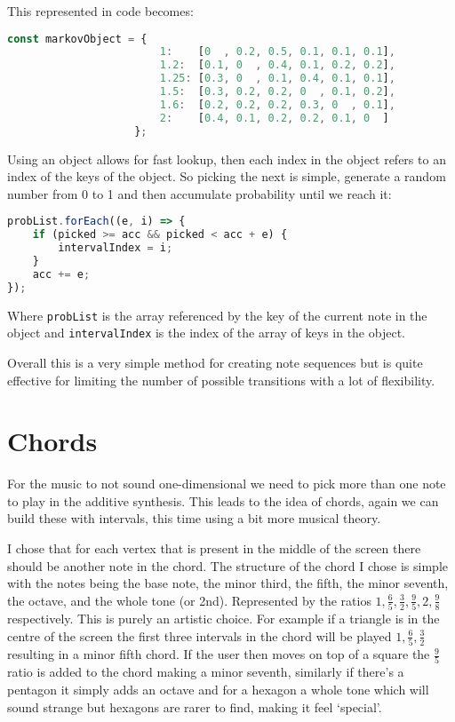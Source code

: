 This represented in code becomes: 
\begin{lstlisting}[language=Javascript]
const markovObject = {
                        1:    [0  , 0.2, 0.5, 0.1, 0.1, 0.1],
                        1.2:  [0.1, 0  , 0.4, 0.1, 0.2, 0.2],
                        1.25: [0.3, 0  , 0.1, 0.4, 0.1, 0.1],
                        1.5:  [0.3, 0.2, 0.2, 0  , 0.1, 0.2],
                        1.6:  [0.2, 0.2, 0.2, 0.3, 0  , 0.1],
                        2:    [0.4, 0.1, 0.2, 0.2, 0.1, 0  ]
                    };
\end{lstlisting}

Using an object allows for fast lookup, then each index in the object refers to
an index of the keys of the object. So picking the next is simple, generate a
random number from 0 to 1 and then accumulate probability until we reach it:

\begin{lstlisting}[language=Javascript]
probList.forEach((e, i) => {
    if (picked >= acc && picked < acc + e) {
        intervalIndex = i;
    }
    acc += e;
});
\end{lstlisting}

Where \verb|probList| is the array referenced by the key of the current note in the
object and \verb|intervalIndex| is the index of the array of keys in the object.

Overall this is a very simple method for creating note sequences but is quite
effective for limiting the number of possible transitions with a lot of
flexibility.  

\section{Chords}
For the music to not sound one-dimensional we need to pick more than one note to
play in the additive synthesis. This leads to the idea of chords, again we can
build these with intervals, this time using a bit more musical theory. 

I chose that for each vertex that is present in the middle of the screen there
should be another note in the chord. The structure of the chord I chose is
simple with the notes being the base note, the minor third, the fifth, the minor
seventh, the octave, and the whole tone (or 2nd). Represented by the ratios $1,
\frac{6}{5}, \frac{3}{2}, \frac{9}{5}, 2, \frac{9}{8}$ respectively. This is
purely an artistic choice. For example if a triangle is in the centre of the
screen the first three intervals in the chord will be played $1, \frac{6}{5},
\frac{3}{2}$ resulting in a minor fifth chord. If the user then moves on top of
a square the $\frac{9}{5}$ ratio is added to the chord making a minor seventh,
similarly if there's a pentagon it simply adds an octave and for a hexagon a
whole tone which will sound strange but hexagons are rarer to find, making it
feel `special'.

